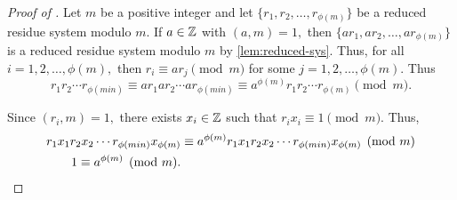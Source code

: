 \documentclass{ximera}
\begin{document}
\begin{proof}[Proof of ]
    Let $m$ be a positive integer and let $\{r_1,r_2,\dots,r_{\phi(m)}\}$ be a reduced residue system modulo $m.$ If $a\in\mathbb Z$ with $(a,m)=1,$ then $\{ar_1,ar_2,\dots,ar_{\phi(m)}\}$ is a reduced residue system modulo $m$ by \cref{lem:reduced-sys}. Thus, for all $i=1,2,\dots, \phi(m),$ then $r_i\equiv a r_j\pmod{m}$ for some $j=1,2,\dots,\phi(m).$ Thus \[r_1 r_2\cdots r_{\phi(min)}\equiv ar_1 ar_2\cdots ar_{\phi(min)}\equiv a^{\phi(m)}r_1 r_2\cdots r_{\phi(m)} \pmod{m}.\]

    Since $(r_i,m)=1,$ there exists $x_i\in\mathbb Z$ such that $r_i x_i\equiv 1\pmod{m}.$ Thus, 
    \begin{align*}
        r_1 x_1 r_2 x_2\cdots r_{\phi(min)} x_{\phi(m)}&\equiv a^{\phi(m)} r_1 x_1 r_2 x_2\cdots r_{\phi(min)} x_{\phi(m)} \pmod{m}\\
        1\equiv a^{\phi(m)} \pmod{m}.\qedhere
    \end{align*}
\end{proof}
\end{document}
